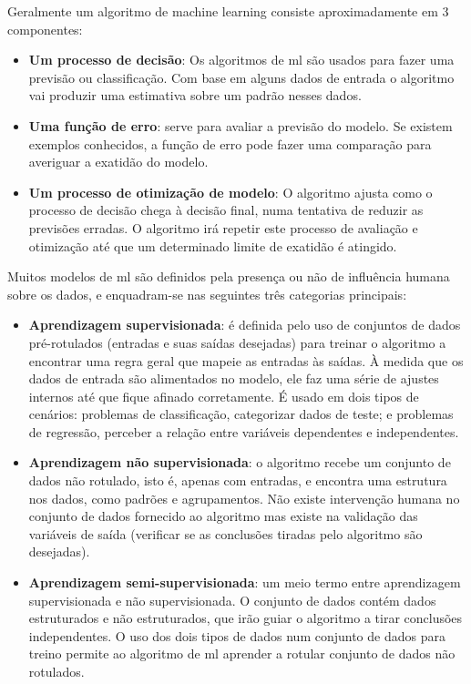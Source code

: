 Geralmente um algoritmo de machine learning consiste aproximadamente em 3 componentes:

\begin{itemize}
\item \textbf{Um processo de decisão}: Os algoritmos de \ac{ml} são usados para fazer uma previsão ou classificação. Com base em alguns dados de entrada o algoritmo vai produzir uma estimativa sobre um padrão nesses dados.
\item \textbf{Uma função de erro}: serve para avaliar a previsão do modelo. Se existem exemplos conhecidos, a função de erro pode fazer uma comparação para averiguar a exatidão do modelo.
\item \textbf{Um processo de otimização de modelo}: O algoritmo ajusta como o processo de decisão chega à decisão final, numa tentativa de reduzir as previsões erradas. O algoritmo irá repetir este processo de avaliação e otimização até que um determinado limite de exatidão é atingido.
\end{itemize}

Muitos modelos de \ac{ml} são definidos pela presença ou não de influência humana sobre os dados, e  enquadram-se nas seguintes três categorias principais:
\begin{itemize}
\item \textbf{Aprendizagem supervisionada}:  é definida pelo uso de conjuntos de dados pré-rotulados (entradas e suas saídas desejadas) para treinar o algoritmo a encontrar uma regra geral que mapeie as entradas às saídas. À medida que os dados de entrada são alimentados no modelo, ele faz uma série de ajustes internos até que fique afinado corretamente. É usado em dois tipos de cenários: problemas de classificação, categorizar dados de teste; e problemas de regressão, perceber a relação entre variáveis dependentes e independentes.


\item \textbf{Aprendizagem não supervisionada}: o algoritmo recebe um conjunto de dados não rotulado, isto é, apenas com entradas, e encontra uma estrutura nos dados, como padrões e agrupamentos. Não existe intervenção humana no conjunto de dados fornecido ao algoritmo mas existe na validação das variáveis de saída (verificar se as conclusões tiradas pelo algoritmo são desejadas).


\item \textbf{Aprendizagem semi-supervisionada}: um meio termo entre aprendizagem supervisionada e não supervisionada. O conjunto de dados contém  dados estruturados e não estruturados, que irão guiar o algoritmo a tirar conclusões independentes. O uso dos dois tipos de dados num conjunto de dados para treino permite ao algoritmo de \ac{ml} aprender a rotular conjunto de dados não rotulados.

\end{itemize}
